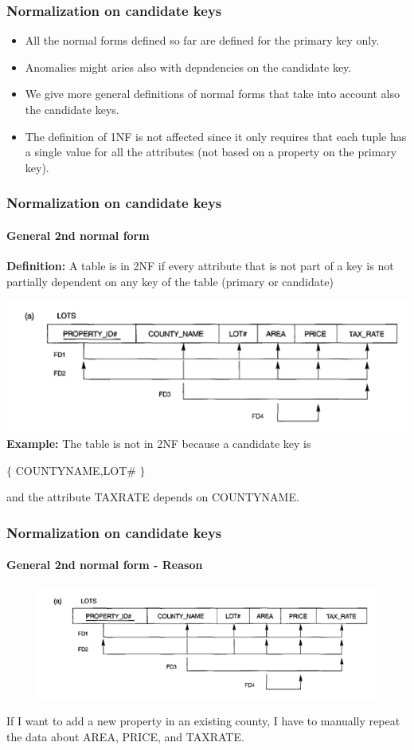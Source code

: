 \documentclass{beamer}
\newcommand{\valseq}[1]{$\lbrace$ #1 $\rbrace$}
\begin{document}

\begin{frame}
	\frametitle{Normalization on candidate keys}
	
	\begin{itemize}
		\item All the normal forms defined so far are defined for the primary key only.
		\item Anomalies might aries also with depndencies on the candidate key.
		\item We give more general definitions of normal forms that take into account also the candidate keys.
		\item The definition of 1NF is not affected since it only requires that each tuple has a single value for all the attributes (not based on a property on the primary key).		
	\end{itemize}
\end{frame}

\begin{frame}
	\frametitle{Normalization on candidate keys}
	\framesubtitle{General 2nd normal form}
	
	\textbf{Definition:}
	A table is in 2NF if every attribute that is not part of a key is not partially dependent on any key of the table (primary or candidate)
	
	\includegraphics[scale=0.4]{img/normalization/norm12}
\pause	
	\textbf{Example:}
	The table is not in 2NF because a candidate key is
	
	\valseq{COUNTY\textunderscore NAME,LOT\#} 
	
	and the attribute TAX\textunderscore RATE depends on COUNTY\textunderscore NAME.
\end{frame}

\begin{frame}
	\frametitle{Normalization on candidate keys}
	\framesubtitle{General 2nd normal form - Reason}
	
	\begin{figure}
		\includegraphics[scale=0.4]{img/normalization/norm12}
	\end{figure}
	
	If I want to add a new property in an existing county, I have to manually repeat the data about AREA, PRICE, and TAX\textunderscore RATE.
\end{frame}
\end{document}
